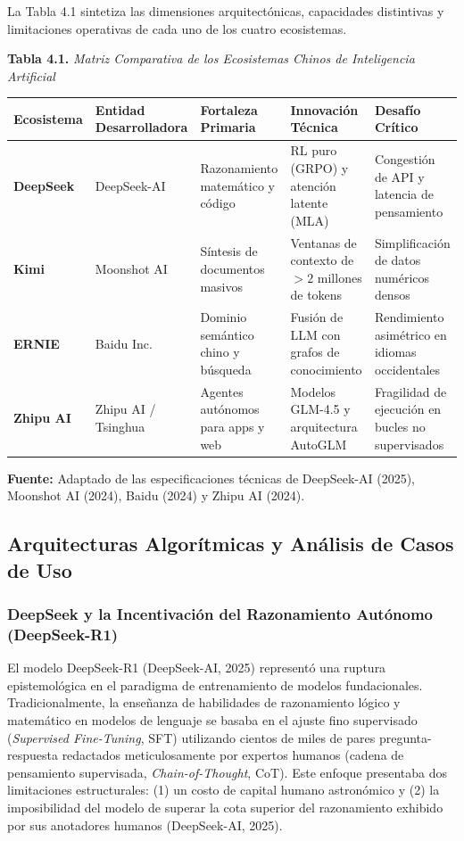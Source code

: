 La Tabla 4.1 sintetiza las dimensiones arquitectónicas, capacidades distintivas y limitaciones operativas de cada uno de los cuatro ecosistemas.

\begin{table}[htbp]
\centering
\small
\textbf{Tabla 4.1.} \textit{Matriz Comparativa de los Ecosistemas Chinos de Inteligencia Artificial}\\[0.25cm]
\label{tab:comparativa_ecosistemas_chinos}
\begin{tabularx}{\textwidth}{l p{2.8cm} p{3.2cm} p{3.2cm} X}
\toprule
\textbf{Ecosistema} & \textbf{Entidad Desarrolladora} & \textbf{Fortaleza Primaria} & \textbf{Innovación Técnica} & \textbf{Desafío Crítico} \\
\midrule
\textbf{DeepSeek} & DeepSeek-AI & Razonamiento matemático y código & RL puro (GRPO) y atención latente (MLA) & Congestión de API y latencia de pensamiento \\
\textbf{Kimi} & Moonshot AI & Síntesis de documentos masivos & Ventanas de contexto de $>2$ millones de tokens & Simplificación de datos numéricos densos \\
\textbf{ERNIE} & Baidu Inc. & Dominio semántico chino y búsqueda & Fusión de LLM con grafos de conocimiento & Rendimiento asimétrico en idiomas occidentales \\
\textbf{Zhipu AI} & Zhipu AI / Tsinghua & Agentes autónomos para apps y web & Modelos GLM-4.5 y arquitectura AutoGLM & Fragilidad de ejecución en bucles no supervisados \\
\bottomrule
\end{tabularx}
\begin{center}
\scriptsize \textbf{Fuente:} Adaptado de las especificaciones técnicas de DeepSeek-AI (2025), Moonshot AI (2024), Baidu (2024) y Zhipu AI (2024).
\end{center}
\end{table}

\subsection{Arquitecturas Algorítmicas y Análisis de Casos de Uso}

\subsubsection{DeepSeek y la Incentivación del Razonamiento Autónomo (DeepSeek-R1)}

El modelo DeepSeek-R1 (DeepSeek-AI, 2025) representó una ruptura epistemológica en el paradigma de entrenamiento de modelos fundacionales. Tradicionalmente, la enseñanza de habilidades de razonamiento lógico y matemático en modelos de lenguaje se basaba en el ajuste fino supervisado (\textit{Supervised Fine-Tuning}, SFT) utilizando cientos de miles de pares pregunta-respuesta redactados meticulosamente por expertos humanos (cadena de pensamiento supervisada, \textit{Chain-of-Thought}, CoT). Este enfoque presentaba dos limitaciones estructurales: (1) un costo de capital humano astronómico y (2) la imposibilidad del modelo de superar la cota superior del razonamiento exhibido por sus anotadores humanos (DeepSeek-AI, 2025).

